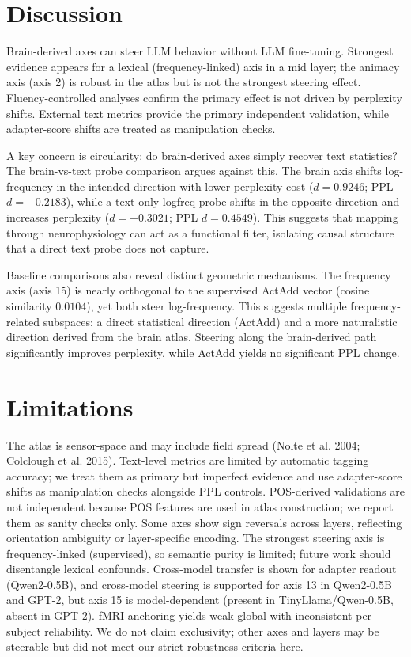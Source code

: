 \documentclass[
]{article}
\begin{document}
\section{Discussion}\label{discussion}

Brain-derived axes can steer LLM behavior without LLM fine-tuning.
Strongest evidence appears for a lexical (frequency-linked) axis in a
mid layer; the animacy axis (axis 2) is robust in the atlas but is not
the strongest steering effect. Fluency-controlled analyses confirm the
primary effect is not driven by perplexity shifts. External text metrics
provide the primary independent validation, while adapter-score shifts
are treated as manipulation checks.

A key concern is circularity: do brain-derived axes simply recover text
statistics? The brain-vs-text probe comparison argues against this. The
brain axis shifts log-frequency in the intended direction with lower
perplexity cost (\(d=0.9246\); PPL \(d=-0.2183\)), while a text-only
logfreq probe shifts in the opposite direction and increases perplexity
(\(d=-0.3021\); PPL \(d=0.4549\)). This suggests that mapping through
neurophysiology can act as a functional filter, isolating causal
structure that a direct text probe does not capture.

Baseline comparisons also reveal distinct geometric mechanisms. The
frequency axis (axis 15) is nearly orthogonal to the supervised ActAdd
vector (cosine similarity \(0.0104\)), yet both steer log-frequency.
This suggests multiple frequency-related subspaces: a direct statistical
direction (ActAdd) and a more naturalistic direction derived from the
brain atlas. Steering along the brain-derived path significantly
improves perplexity, while ActAdd yields no significant PPL change.

\section{Limitations}\label{limitations}

The atlas is sensor-space and may include field spread (Nolte et al.
2004; Colclough et al. 2015). Text-level metrics are limited by
automatic tagging accuracy; we treat them as primary but imperfect
evidence and use adapter-score shifts as manipulation checks alongside
PPL controls. POS-derived validations are not independent because POS
features are used in atlas construction; we report them as sanity checks
only. Some axes show sign reversals across layers, reflecting
orientation ambiguity or layer-specific encoding. The strongest steering
axis is frequency-linked (supervised), so semantic purity is limited;
future work should disentangle lexical confounds. Cross-model transfer
is shown for adapter readout (Qwen2-0.5B), and cross-model steering is
supported for axis 13 in Qwen2-0.5B and GPT-2, but axis 15 is
model-dependent (present in TinyLlama/Qwen-0.5B, absent in GPT-2). fMRI
anchoring yields weak global with inconsistent per-subject reliability.
We do not claim exclusivity; other axes and layers may be steerable but
did not meet our strict robustness criteria here.
\end{document}
